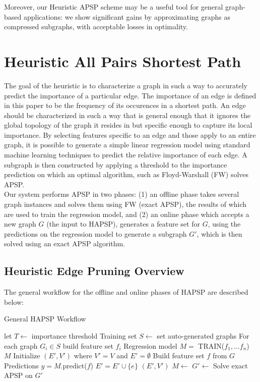 \documentclass[10.5pt,journal]{IEEEtran}
\begin{document}
	Moreover, our Heuristic APSP scheme may be a useful tool for general graph-based applications: we show
	significant gains by approximating graphs as compressed subgraphs, with acceptable losses in
	optimality. 

\section{Heuristic All Pairs Shortest Path}
The goal of the heuristic is to characterize a graph in such a way to accurately predict
the importance of a particular edge. The importance of an edge is defined in this paper to be the frequency of
its occurences in a shortest path. An edge should be characterized in such a way that is general enough
that it ignores the global topology of the graph it resides in but specific enough to capture its local
importance. By selecting features specific to an edge and those apply to an entire graph, it is possible to
generate a simple linear regression model using standard machine learning techniques to predict
the relative importance of each edge. A subgraph is then constructed by applying a threshold to the importance
prediction on which an optimal algorithm, such as Floyd-Warshall (FW) solves APSP.\\

Our system performs APSP in two phases: (1) an offline phase takes several graph instances and solves them
using FW (exact APSP), the results of which are used to train the regression model, and (2) an online phase
which accepts a new graph $G$ (the input to HAPSP), generates a feature set for $G$, using the predictions
on the regression model to generate a subgraph $G'$, which is then solved using an exact APSP algorithm.

\subsection{Heuristic Edge Pruning Overview}
	The general workflow for the offline and online phases of HAPSP are described below:
	\begin{algorithm}
	\caption{General HAPSP Workflow}
	\begin{algorithmic}[1]
	\State let $T\leftarrow$ importance threshold
		\State Training set $S\leftarrow$ set auto-generated graphs
		\State For each graph $G_i\in S$ build feature set $f_i$
		\State Regression model $M = $ TRAIN($f_1,...f_n$)
		\State\Return $M$
	\EndProcedure
		\State Initialize $(E',V')$ where $V'=V$ and $E' = \emptyset$
		\State Build feature set $f$ from $G$
		\State Predictions $y = M$.predict($f$)
				\State $E'=E'\cup \{e\}$
			\EndIf
		\EndFor
		\State\Return $(E',V')$
	\EndProcedure
		\State $M\leftarrow$
		\State $G'\leftarrow$
		\State Solve exact APSP on $G'$
	\EndProcedure
	\end{algorithmic}
	\label{fig:alg}
	\end{algorithm}
\end{document}
